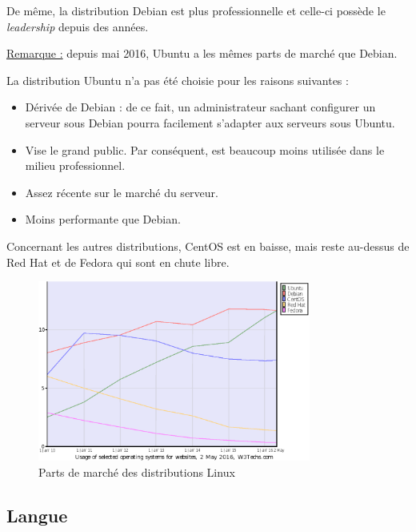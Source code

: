 \newpage

De même, la distribution Debian est plus professionnelle et celle-ci possède le
\textit{leadership} depuis des années.

\underline{Remarque :} depuis mai 2016, Ubuntu a les mêmes parts de marché que
Debian.

La distribution Ubuntu n'a pas été choisie pour les raisons suivantes :
\begin{itemize}
\item Dérivée de Debian : de ce fait, un administrateur sachant configurer un
serveur sous Debian pourra facilement s'adapter aux serveurs sous Ubuntu.

\item Vise le grand public. Par conséquent, est beaucoup moins utilisée dans le
milieu professionnel.

\item Assez récente sur le marché du serveur.

\item Moins performante que Debian.
\end{itemize}

Concernant les autres distributions, CentOS est en baisse, mais reste au-dessus
de Red Hat et de Fedora qui sont en chute libre.

\begin{figure}[h]
  \centering
  \includegraphics[width=0.8\textwidth]
  {textures/images/installation/distributions.eps}
  \caption{Parts de marché des distributions Linux}
\end{figure}

\newpage

\subsection{Langue}
\label{subsec:langue}

